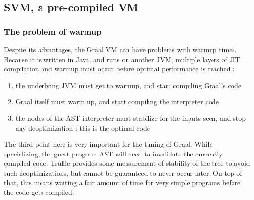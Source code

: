 \documentclass[twoside,11pt,a4paper]{article}
\begin{document}
\subsection{SVM, a pre-compiled VM}

\subsubsection{The problem of warmup}

Despite its advantages, the Graal VM can have problems with warmup times. Because it is written in Java, and runs on another JVM, multiple layers of JIT compilation and warmup must occur before optimal performance is reached :
\begin{enumerate}
\item the underlying JVM must get to warmup, and start compiling Graal's code
\item Graal itself must warm up, and start compiling the interpreter code
\item the nodes of the AST interpreter must stabilize for the inputs seen, and stop any deoptimization : this is the optimal code
\end{enumerate}


The third point here is very important for the tuning of Graal. While specializing, the guest program AST will need to invalidate the currently compiled code. Truffle provides some measurement of stability of the tree to avoid such deoptimizations, but cannot be guaranteed to never occur later. On top of that, this means waiting a fair amount of time for very simple programs before the code gets compiled.

\end{document}
